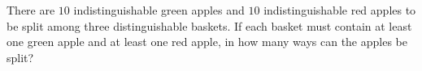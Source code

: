 There are $10$ indistinguishable green apples and $10$ indistinguishable red apples to be split among three distinguishable baskets. If each basket must contain at least one green apple and at least one red apple, in how many ways can the apples be split?
